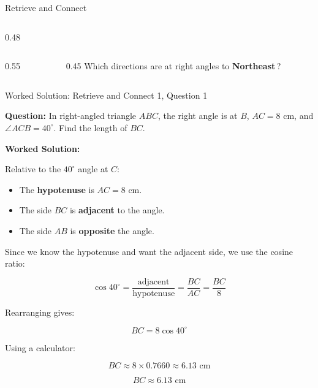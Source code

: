 \documentclass[aspectratio=169,11pt]{beamer}
\begin{document}
\begin{frame}{Retrieve and Connect}
\begin{columns}[t]
\begin{column}{0.48\textwidth}
\begin{columns}[T,onlytextwidth]
\begin{column}{0.55\textwidth}
  \end{column}
  \begin{column}{0.45\textwidth}
    Which directions are at right angles to \textbf{Northeast}\,?
  \end{column}
\end{columns}

\end{column}
\end{columns}

\end{frame}

\begin{frame}{Worked Solution: Retrieve and Connect 1, Question 1}
\hypertarget{work-st1}{}

\textbf{Question:} In right-angled triangle \(ABC\), the right angle is at \(B\), \(AC = 8\text{ cm}\), and \(\angle ACB = 40^\circ\). Find the length of \(BC\).

\textbf{Worked Solution:}

Relative to the \(40^\circ\) angle at \(C\):
\begin{itemize}
\item The \textbf{hypotenuse} is \(AC = 8\text{ cm}\).
\item The side \(BC\) is \textbf{adjacent} to the angle.
\item The side \(AB\) is \textbf{opposite} the angle.
\end{itemize}

Since we know the hypotenuse and want the adjacent side, we use the cosine ratio:

\[
\cos 40^\circ = \frac{\text{adjacent}}{\text{hypotenuse}} = \frac{BC}{AC} = \frac{BC}{8}
\]

Rearranging gives:

\[
BC = 8\cos 40^\circ
\]

Using a calculator:

\[
BC \approx 8 \times 0.7660 \approx 6.13\text{ cm}
\]

\[
\boxed{BC \approx 6.13\text{ cm}}
\]

\end{frame}
\end{document}
